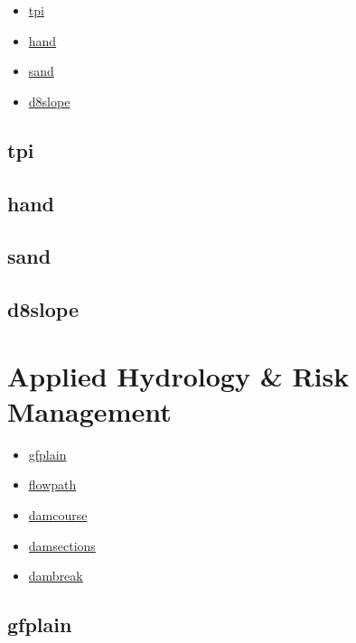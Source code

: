 \documentclass[
]{book}
\providecommand{\tightlist}{%
  \setlength{\itemsep}{0pt}\setlength{\parskip}{0pt}}
\theoremstyle{definition}
\theoremstyle{definition}
\theoremstyle{definition}
\theoremstyle{definition}
\theoremstyle{remark}
\begin{document}
\begin{itemize}
\tightlist
\item
  \hyperref[tpi]{tpi}\\
\item
  \hyperref[hand]{hand}\\
\item
  \hyperref[sand]{sand}\\
\item
  \hyperref[d8slope]{d8slope}
\end{itemize}

\subsection{tpi}\label{tpi}

\subsection{hand}\label{hand}

\subsection{sand}\label{sand}

\subsection{d8slope}\label{d8slope}

\section{Applied Hydrology \& Risk Management}\label{Applied-Hydrology-Risk-Management}

\begin{itemize}
\tightlist
\item
  \hyperref[gfplain]{gfplain}\\
\item
  \hyperref[flowpath]{flowpath}\\
\item
  \hyperref[damcourse]{damcourse}\\
\item
  \hyperref[damsections]{damsections}\\
\item
  \hyperref[dambreak]{dambreak}
\end{itemize}

\subsection{gfplain}\label{gfplain}
\end{document}
